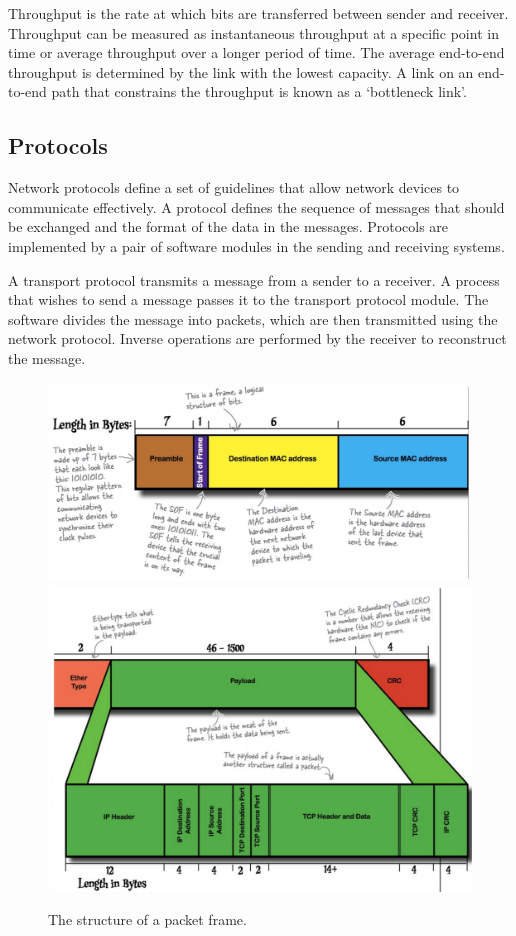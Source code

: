 Throughput is the rate at which bits are transferred between sender and receiver.
Throughput can be measured as instantaneous throughput at a specific point in time or average throughput over a longer period of time.
The average end-to-end throughput is determined by the link with the lowest capacity.
A link on an end-to-end path that constrains the throughput is known as a `bottleneck link'.

\subsection{Protocols}

Network protocols define a set of guidelines that allow network devices to communicate effectively.
A protocol defines the sequence of messages that should be exchanged and the format of the data in the messages.
Protocols are implemented by a pair of software modules in the sending and receiving systems.

A transport protocol transmits a message from a sender to a receiver.
A process that wishes to send a message passes it to the transport protocol module.
The software divides the message into packets, which are then transmitted using the network protocol.
Inverse operations are performed by the receiver to reconstruct the message.

\begin{figure}[htp]
  \centering
  \includegraphics[width=15cm]{unit-16/figures/frame-part-1.png}
  \includegraphics[width=15cm]{unit-16/figures/frame-part-2.png}
  \caption*{The structure of a packet frame.}
\end{figure}

